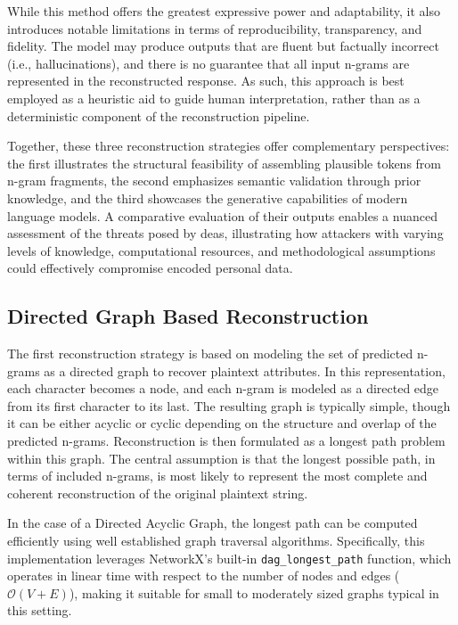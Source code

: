 While this method offers the greatest expressive power and adaptability, it also introduces notable limitations in terms of reproducibility, transparency, and fidelity.
The model may produce outputs that are fluent but factually incorrect (i.e., hallucinations), and there is no guarantee that all input n-grams are represented in the reconstructed response.
As such, this approach is best employed as a heuristic aid to guide human interpretation, rather than as a deterministic component of the reconstruction pipeline.

Together, these three reconstruction strategies offer complementary perspectives: the first illustrates the structural feasibility of assembling plausible tokens from n-gram fragments, the second emphasizes semantic validation through prior knowledge, and the third showcases the generative capabilities of modern language models.
A comparative evaluation of their outputs enables a nuanced assessment of the threats posed by \ac{dea}s, illustrating how attackers with varying levels of knowledge, computational resources, and methodological assumptions could effectively compromise encoded personal data.

\subsection{Directed Graph Based Reconstruction} \label{sec:graphrecon}

The first reconstruction strategy is based on modeling the set of predicted n-grams as a directed graph to recover plaintext attributes.
In this representation, each character becomes a node, and each n-gram is modeled as a directed edge from its first character to its last.
The resulting graph is typically simple, though it can be either acyclic or cyclic depending on the structure and overlap of the predicted n-grams.
Reconstruction is then formulated as a longest path problem within this graph.
The central assumption is that the longest possible path, in terms of included n-grams, is most likely to represent the most complete and coherent reconstruction of the original plaintext string.

In the case of a Directed Acyclic Graph, the longest path can be computed efficiently using well established graph traversal algorithms.
Specifically, this implementation leverages NetworkX’s built-in \texttt{dag\_longest\_path} function, which operates in linear time with respect to the number of nodes and edges (\( \mathcal{O}(V + E) \)), making it suitable for small to moderately sized graphs typical in this setting.


